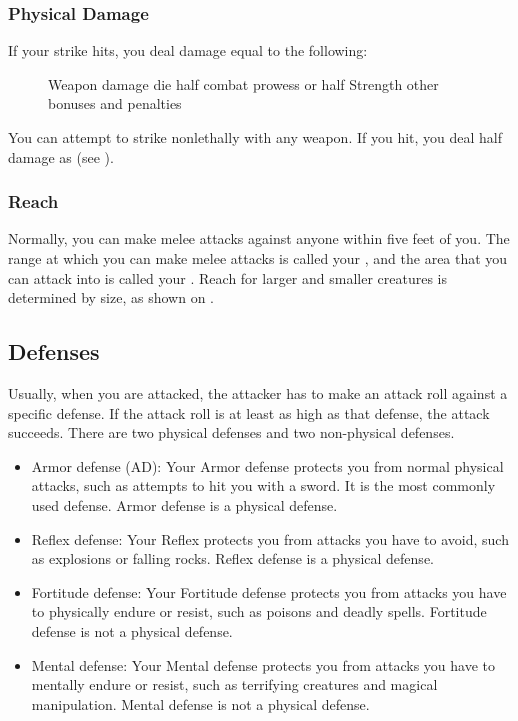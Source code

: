        \subsubsection{Physical Damage}\label{Physical Damage}
            If your strike hits, you deal damage equal to the following:
            \begin{figure}[h]
                \centering Weapon damage die \add half combat prowess or half Strength \add other bonuses and penalties
            \end{figure}

             You can attempt to strike nonlethally with any weapon.
            If you hit, you deal half damage as  (see ).

        \subsubsection{Reach}\label{Reach}
            Normally, you can make melee attacks against anyone within five feet of you.
            The range at which you can make melee attacks is called your , and the area that you can attack into is called your .
            Reach for larger and smaller creatures is determined by size, as shown on .

    \subsection{Defenses}\label{Defenses}
        Usually, when you are attacked, the attacker has to make an attack roll against a specific defense.
        If the attack roll is at least as high as that defense, the attack succeeds.
        There are two physical defenses and two non-physical defenses.
        \begin{itemize}
            \item Armor defense (AD): Your Armor defense protects you from normal physical attacks, such as attempts to hit you with a sword.
                It is the most commonly used defense.
                Armor defense is a physical defense.
            \item Reflex defense: Your Reflex protects you from attacks you have to avoid, such as explosions or falling rocks.
                Reflex defense is a physical defense.
            \item Fortitude defense: Your Fortitude defense protects you from attacks you have to physically endure or resist, such as poisons and deadly spells.
                Fortitude defense is not a physical defense.
            \item Mental defense: Your Mental defense protects you from attacks you have to mentally endure or resist, such as terrifying creatures and magical manipulation.
                Mental defense is not a physical defense.
        \end{itemize}

